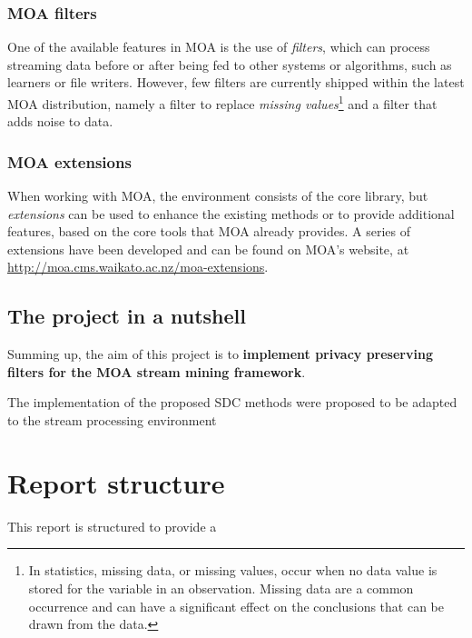 \subsubsection{MOA filters}

One of the available features in MOA is the use of \textit{filters}, which can process
streaming data before or after being fed to other systems or algorithms, such as learners
or file writers. However, few filters are currently shipped within the latest MOA distribution,
namely a filter to replace \textit{missing values}\footnote{In statistics, missing data, or missing values,
occur when no data value is stored for the variable in an observation. Missing data are a
common occurrence and can have a significant effect on the conclusions that can be drawn
from the data.} and a filter that adds noise to data.

\subsubsection{MOA extensions}

When working with MOA, the environment consists of the core library, but \textit{extensions}
can be used to enhance the existing methods or to provide additional features, based on
the core tools that MOA already provides. A series of extensions have been developed and can
be found on MOA's website, at \url{http://moa.cms.waikato.ac.nz/moa-extensions}.

\subsection{The project in a nutshell}
\label{Introduction::moa-ppsm::ProjectNutshell}

Summing up, the aim of this project is to \textbf{implement privacy preserving filters
for the MOA stream mining framework}.

The implementation of the proposed SDC methods were proposed to be adapted to the stream processing environment

\section{Report structure}
\label{Introduction::Structure}

This report is structured to provide a
